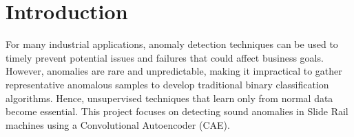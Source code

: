 \section{Introduction}
\label{sec:Introduction}

For many industrial applications, anomaly detection techniques can be used to timely prevent potential issues and failures that could affect business goals. However, anomalies are rare and unpredictable, making it impractical to gather representative anomalous samples to develop traditional binary classification algorithms. Hence, unsupervised techniques that learn only from normal data become essential. This project focuses on detecting sound anomalies in Slide Rail machines using a Convolutional Autoencoder (CAE).



